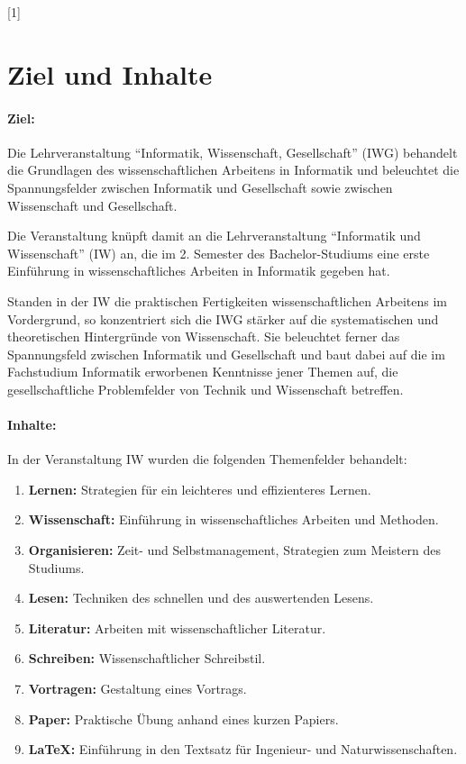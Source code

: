 \documentclass[a4paper]{article}%
\begin{document}
\startcontents[part1]
[1]{}

\clearpage%


\section{Ziel und Inhalte}\label{ZieleUndInhalte}

\paragraph{Ziel:} Die Lehrveranstaltung \enquote{Informatik, Wissenschaft, Gesellschaft} (IWG) 
behandelt die Grundlagen des wissenschaftlichen Arbeitens in Informatik und beleuchtet
die Spannungsfelder zwischen Informatik und Gesellschaft sowie zwischen
Wissenschaft und Gesellschaft.

Die Veranstaltung knüpft damit an die Lehrveranstaltung \enquote{Informatik und Wissenschaft} (IW)
an, die im 2. Semester des Bachelor-Studiums eine erste Einführung in
wissenschaftliches Arbeiten in Informatik gegeben hat.

Standen in der IW die praktischen Fertigkeiten wissenschaftlichen Arbeitens
im Vordergrund, so konzentriert sich die IWG
stärker auf die systematischen und theoretischen Hintergründe von Wissenschaft. Sie beleuchtet
ferner das Spannungsfeld zwischen Informatik und Gesellschaft und baut dabei auf die
im Fachstudium Informatik erworbenen Kenntnisse jener Themen auf, die gesellschaftliche 
Problemfelder von Technik und Wissenschaft betreffen.


\paragraph{Inhalte:} In der Veranstaltung IW wurden die folgenden Themenfelder behandelt:
\begin{enumerate}
\item \textbf{Lernen:} \hfill Strategien für ein leichteres und effizienteres Lernen.
\item \textbf{Wissenschaft:} \hfill Einführung in wissenschaftliches Arbeiten und Methoden.
\item \textbf{Organisieren:} \hfill Zeit- und Selbstmanagement, Strategien zum Meistern des Studiums.
\item \textbf{Lesen:} \hfill Techniken des schnellen und des auswertenden Lesens.
\item \textbf{Literatur:} \hfill Arbeiten mit wissenschaftlicher Literatur.
\item \textbf{Schreiben:} \hfill Wissenschaftlicher Schreibstil.
\item \textbf{Vortragen:} \hfill Gestaltung eines Vortrags.
\item \textbf{Paper:} \hfill Praktische Übung anhand eines kurzen Papiers.
\item \textbf{\LaTeX:} \hfill Einführung in den Textsatz für Ingenieur- und Naturwissenschaften.
\end{enumerate}
\end{document}
